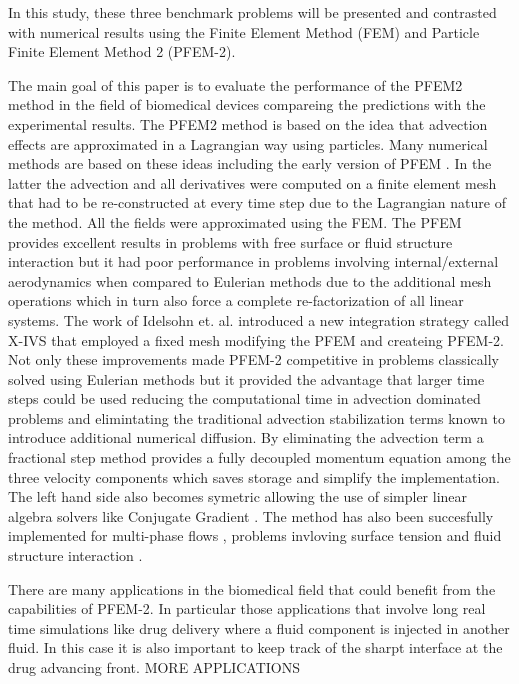 In this study, these three benchmark problems will be presented and contrasted with numerical results using the Finite Element Method (FEM) and Particle Finite Element Method 2 (PFEM-2).


The main goal of this paper is to evaluate the performance of the PFEM2 method in the field of biomedical devices compareing the predictions with the experimental results. The PFEM2 method is based on the idea that advection effects are approximated in a Lagrangian way using particles. Many numerical methods are based on these ideas \cite{sph,mps,pic,mac} including the early version of PFEM \cite{sergio:PFEM}. In the latter the advection and all derivatives were computed on a finite element mesh that had to be re-constructed at every time step due to the Lagrangian nature of the method. All the fields were approximated using the FEM. The PFEM provides excellent results in problems with free surface or fluid structure interaction but it had poor performance in problems involving internal/external aerodynamics when compared to Eulerian methods due to the additional mesh operations which in turn also force a complete re-factorization of all linear systems. The work of Idelsohn et. al. \cite{sergio:xivs1,sergio:xivs2} introduced a new integration strategy called X-IVS that employed a fixed mesh modifying the PFEM and createing PFEM-2. Not only these improvements made PFEM-2 competitive in problems classically solved using Eulerian methods but it provided the advantage that larger time steps could be used \cite{gimenez:parallel} reducing the computational time in advection dominated problems and elimintating the traditional advection stabilization terms known to introduce additional numerical diffusion. By eliminating the advection term a fractional step method provides a fully decoupled momentum equation among the three velocity components which saves storage and simplify the implementation. The left hand side also becomes symetric allowing the use of simpler linear algebra solvers like Conjugate Gradient \cite{conjgrad}. The method has also been succesfully implemented for multi-phase flows \cite{sergio:pfem2_lts,gimenez:fs,gimenez:tesis}, problems invloving surface tension \cite{gimenez:st} and fluid structure interaction \cite{pablo:FSI}.

There are many applications in the biomedical field that could benefit from the capabilities of PFEM-2. In particular those applications that involve long real time simulations like drug delivery where a fluid component is injected in another fluid. In this case it is also important to keep track of the sharpt interface at the drug advancing front. {MORE APPLICATIONS}

